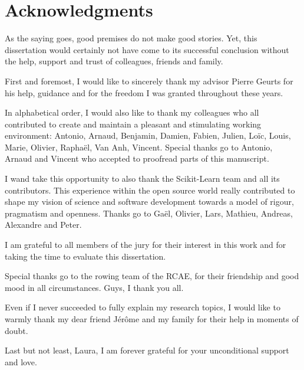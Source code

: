 
\chapter*{Acknowledgments}

As the saying goes, good premises do not make good stories. Yet, this
dissertation would certainly not have come to its successful conclusion
without the help, support and trust of colleagues, friends and family.

First and foremost, I would like to sincerely thank my advisor Pierre Geurts
for his help, guidance and for the freedom I was granted throughout these
years.

In alphabetical order, I would also like to thank my colleagues who all
contributed to create and maintain a pleasant and stimulating working
environment: Antonio, Arnaud, Benjamin, Damien, Fabien, Julien, Lo\"{i}c,
Louis, Marie, Olivier, Rapha\"{e}l, Van Anh, Vincent. Special thanks go to
Antonio, Arnaud and Vincent who accepted to proofread parts of this manuscript.

I wand take this opportunity to also thank the Scikit-Learn team and all its
contributors. This experience within the open source world really contributed
to shape my vision of science and software development towards a model
of rigour, pragmatism and openness. Thanks go to Ga\"{e}l, Olivier, Lars,
Mathieu, Andreas, Alexandre and Peter.

I am grateful to all members of the jury for their interest in this work
and for taking the  time to evaluate this dissertation.

Special thanks go to the rowing team of the RCAE, for their friendship
and good mood in all circumstances. Guys, I thank you all.

Even if I never succeeded to fully explain my research topics, I would like to
warmly thank my dear friend J\'er\^{o}me and my family for their help
in moments of doubt.

Last but not least, Laura, I am forever grateful for your unconditional support
and love.
